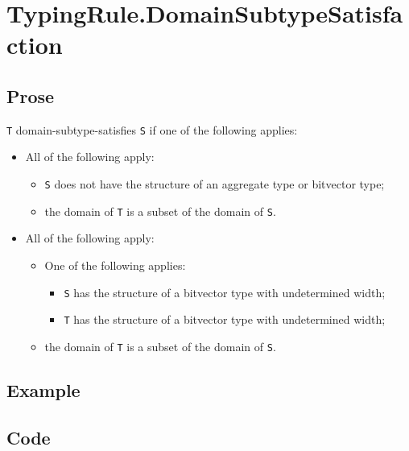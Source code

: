 \documentclass{book}
\begin{document}
\section{TypingRule.DomainSubtypeSatisfaction}

\subsection{Prose}
 \texttt{T} domain-subtype-satisfies \texttt{S} if one of the following applies:
 \begin{itemize}
 \item All of the following apply:
    \begin{itemize}
    \item \texttt{S} does not have the structure of an aggregate type or bitvector type;
    \item the domain of \texttt{T} is a subset of the domain of \texttt{S}.
    \end{itemize}

  \item All of the following apply:
  \begin{itemize}
    \item One of the following applies:
      \begin{itemize}
      \item \texttt{S} has the structure of a bitvector type with undetermined width;
      \item \texttt{T} has the structure of a bitvector type with undetermined width;
      \end{itemize}
   \item the domain of \texttt{T} is a subset of the domain of \texttt{S}.
   \end{itemize}
  \end{itemize}

  \subsection{Example}

  \subsection{Code}
\end{document}
